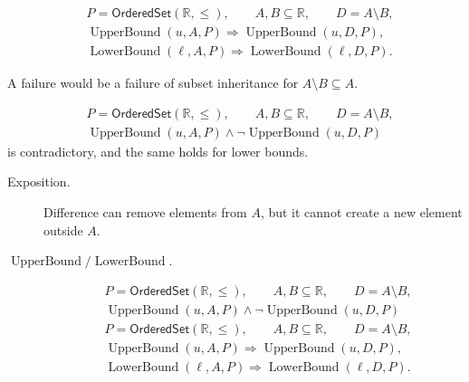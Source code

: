\begin{remark*}
\[
\begin{aligned}
&P=\mathsf{OrderedSet}(\mathbb{R},\leq),\qquad A,B\subseteq\mathbb{R},\qquad D=A\setminus B,\\
&\operatorname{UpperBound}(u,A,P)\Longrightarrow\operatorname{UpperBound}(u,D,P),\\
&\operatorname{LowerBound}(\ell,A,P)\Longrightarrow\operatorname{LowerBound}(\ell,D,P).
\end{aligned}
\]
\end{remark*}

\begin{remark*}
A failure would be a failure of subset inheritance for
$A\setminus B\subseteq A$.
\end{remark*}

\begin{remark*}
\[
\begin{aligned}
&P=\mathsf{OrderedSet}(\mathbb{R},\leq),\qquad A,B\subseteq\mathbb{R},\qquad D=A\setminus B,\\
&\operatorname{UpperBound}(u,A,P)\land
\neg\operatorname{UpperBound}(u,D,P)
\end{aligned}
\]
is contradictory, and the same holds for lower bounds.
\end{remark*}

\begin{remark*}
\begin{description}
\item[Exposition.]
Difference can remove elements from $A$, but it cannot create a new element
outside $A$.


  \item[\(\operatorname{UpperBound} / \operatorname{LowerBound}.\)]

\[
\begin{aligned}
&P=\mathsf{OrderedSet}(\mathbb{R},\leq),\qquad A,B\subseteq\mathbb{R},\qquad D=A\setminus B,\\
&\operatorname{UpperBound}(u,A,P)\land
\neg\operatorname{UpperBound}(u,D,P)
\end{aligned}
\]
\[
\begin{aligned}
&P=\mathsf{OrderedSet}(\mathbb{R},\leq),\qquad A,B\subseteq\mathbb{R},\qquad D=A\setminus B,\\
&\operatorname{UpperBound}(u,A,P)\Longrightarrow\operatorname{UpperBound}(u,D,P),\\
&\operatorname{LowerBound}(\ell,A,P)\Longrightarrow\operatorname{LowerBound}(\ell,D,P).
\end{aligned}
\]
\end{description}
\end{remark*}

